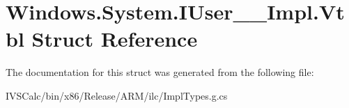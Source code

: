 \hypertarget{struct_windows_1_1_system_1_1_i_user_____impl_1_1_vtbl}{}\section{Windows.\+System.\+I\+User\+\_\+\+\_\+\+Impl.\+Vtbl Struct Reference}
\label{struct_windows_1_1_system_1_1_i_user_____impl_1_1_vtbl}


The documentation for this struct was generated from the following file\+:\begin{DoxyCompactItemize}
\item 
I\+V\+S\+Calc/bin/x86/\+Release/\+A\+R\+M/ilc/Impl\+Types.\+g.\+cs\end{DoxyCompactItemize}
